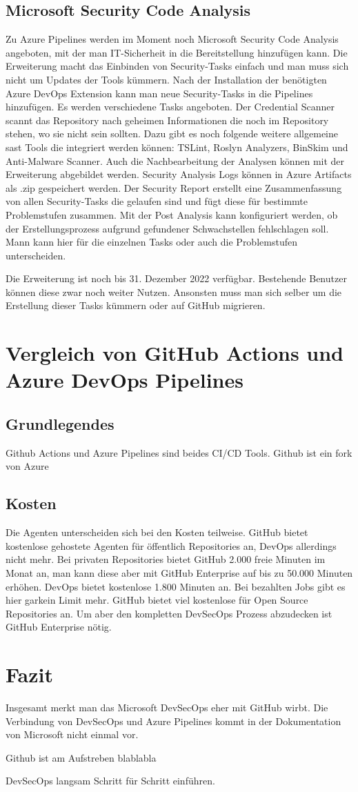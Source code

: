 \section{Microsoft Security Code Analysis}
Zu Azure Pipelines werden im Moment noch Microsoft Security Code Analysis angeboten, mit der man IT-Sicherheit in die Bereitstellung hinzufügen kann.
Die Erweiterung macht das Einbinden von Security-Tasks einfach und man muss sich nicht um Updates der Tools kümmern. Nach der Installation der benötigten Azure DevOps Extension kann man neue Security-Tasks in die Pipelines hinzufügen. \cite{mic-msca-install}
Es werden verschiedene Tasks angeboten. Der Credential Scanner scannt das Repository nach geheimen Informationen die noch im Repository stehen, wo sie nicht sein sollten. Dazu gibt es noch folgende weitere allgemeine \ac{sast} Tools die integriert werden können: TSLint, Roslyn Analyzers, BinSkim und Anti-Malware Scanner.
Auch die Nachbearbeitung der Analysen können mit der Erweiterung abgebildet werden. Security Analysis Logs können in Azure Artifacts als .zip gespeichert werden. Der Security Report erstellt eine Zusammenfassung von allen Security-Tasks die gelaufen sind und fügt diese für bestimmte Problemstufen zusammen. Mit der Post Analysis kann konfiguriert werden, ob der Erstellungsprozess aufgrund gefundener Schwachstellen fehlschlagen soll. Mann kann hier für die einzelnen Tasks oder auch die Problemstufen unterscheiden. \cite{mic-msca-generall}

Die Erweiterung ist noch bis 31. Dezember 2022 verfügbar. Bestehende Benutzer können diese zwar noch weiter Nutzen. Ansonsten muss man sich selber um die Erstellung dieser Tasks kümmern oder auf GitHub migrieren. \cite{mic-msca-generall}

\chapter{Vergleich von GitHub Actions und Azure DevOps Pipelines}
\section{Grundlegendes}
Github Actions und Azure Pipelines sind beides CI/CD Tools. Github ist ein fork von Azure

\section{Kosten}
Die Agenten unterscheiden sich bei den Kosten teilweise. GitHub bietet kostenlose gehostete Agenten für öffentlich Repositories an, DevOps allerdings nicht mehr. Bei privaten Repositories bietet GitHub 2.000 freie Minuten im Monat an, man kann diese aber mit GitHub Enterprise auf bis zu 50.000 Minuten erhöhen. DevOps bietet kostenlose 1.800 Minuten an. Bei bezahlten Jobs gibt es hier garkein Limit mehr. 
GitHub bietet viel kostenlose für Open Source Repositories an. Um aber den kompletten DevSecOps Prozess abzudecken ist GitHub Enterprise nötig.

\chapter{Fazit}
Insgesamt merkt man das Microsoft DevSecOps eher mit GitHub wirbt. Die Verbindung von DevSecOps und Azure Pipelines kommt in der Dokumentation von Microsoft nicht einmal vor.

Github ist am Aufstreben blablabla

DevSecOps langsam Schritt für Schritt einführen.